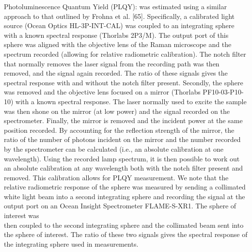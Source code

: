 \documentclass[10pt]{article}
\begin{document}
Photoluminescence Quantum Yield (PLQY): was estimated using a similar approach to that outlined by Frohna et al. [65]. Specifically, a calibrated light source (Ocean Optics HL-3P-INT-CAL) was coupled to an integrating sphere with a known spectral response (Thorlabs 2P3/M). The output port of this sphere was aligned with the objective lens of the Raman microscope and the spectrum recorded (allowing for relative radiometric calibration). The notch filter that normally removes the laser signal from the recording path was then removed, and the signal again recorded. The ratio of these signals gives the spectral response with and without the notch filter present. Secondly, the sphere was removed and the objective lens focused on a mirror (Thorlabs PF10-03-P10-10) with a known spectral response. The laser normally used to excite the sample was then shone on the mirror (at low power) and the signal recorded on the spectrometer. Finally, the mirror is removed and the incident power at the same position recorded. By accounting for the reflection strength of the mirror, the ratio of the number of photons incident on the mirror and the number recorded by the spectrometer can be calculated (i.e., an absolute calibration at one wavelength). Using the recorded lamp spectrum, it is then possible to work out an absolute calibration at any wavelength both with the notch filter present and removed. This calibration allows for PLQY measurement. We note that the relative radiometric response of the sphere was measured by sending a collimated white light beam into a second integrating sphere and recording the signal at the output port on an Ocean Insight Spectrometer FLAME-S-XR1. The sphere of interest was\\
then coupled to the second integrating sphere and the collimated beam sent into the sphere of interest. The ratio of these two signals gives the spectral response of the integrating sphere used in measurements.
\end{document}

